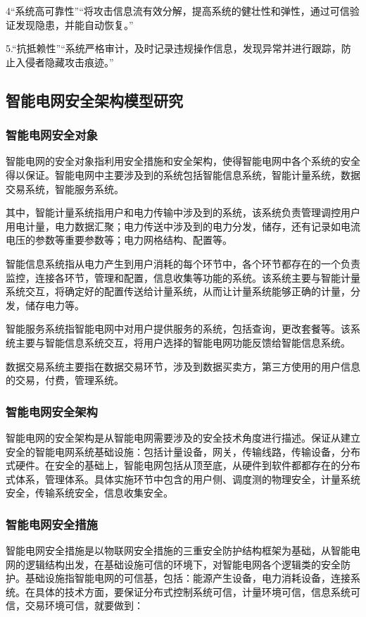 \documentclass[10.5pt,twocolumn]{jbuaa}
\begin{document}
4“系统高可靠性”“将攻击信息流有效分解，提高系统的健壮性和弹性，通过可信验证发现隐患，并能自动恢复。”

5.“抗抵赖性”“系统严格审计，及时记录违规操作信息，发现异常并进行跟踪，防止入侵者隐藏攻击痕迹。”

\subsection{智能电网安全架构模型研究}
\subsubsection{智能电网安全对象}
智能电网的安全对象指利用安全措施和安全架构，使得智能电网中各个系统的安全得以保证。智能电网中主要涉及到的系统包括智能信息系统，智能计量系统，数据交易系统，智能服务系统。

其中，智能计量系统指用户和电力传输中涉及到的系统，该系统负责管理调控用户用电计量，电力数据汇聚；电力传送中涉及到的电力分发，储存，还有记录如电流电压的参数等重要参数等；电力网格结构、配置等。

智能信息系统指从电力产生到用户消耗的每个环节中，各个环节都存在的一个负责监控，连接各环节，管理和配置，信息收集等功能的系统。该系统主要与智能计量系统交互，将确定好的配置传送给计量系统，从而让计量系统能够正确的计量，分发，储存电力等。

智能服务系统指智能电网中对用户提供服务的系统，包括查询，更改套餐等。该系统主要与智能信息系统交互，将用户选择的智能电网功能反馈给智能信息系统。

数据交易系统主要指在数据交易环节，涉及到数据买卖方，第三方使用的用户信息的交易，付费，管理系统。

\subsubsection{智能电网安全架构}
智能电网的安全架构是从智能电网需要涉及的安全技术角度进行描述。保证从建立安全的智能电网系统基础设施：包括计量设备，网关，传输线路，传输设备，分布式硬件。在安全的基础上，智能电网包括从顶至底，从硬件到软件都都存在的分布式体系，管理体系。具体实施环节中包含的用户侧、调度测的物理安全，计量系统安全，传输系统安全，信息收集安全。

\subsubsection{智能电网安全措施}

智能电网安全措施是以物联网安全措施的三重安全防护结构框架为基础，从智能电网的逻辑结构出发，在基础设施可信的环境下，对智能电网各个逻辑类的安全防护。基础设施指智能电网的可信基，包括：能源产生设备，电力消耗设备，连接系统。在具体的技术方面，要保证分布式控制系统可信，计量环境可信，信息系统可信，交易环境可信，就要做到：
\end{document}
